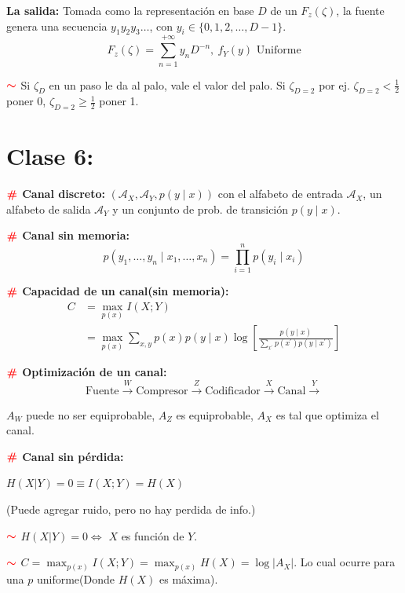 \documentclass[%
 reprint,
 amsmath,amssymb,
 aps,
]{revtex4-1}
\begin{document}
\textbf{La salida:} 
Tomada como la representación en base $D$ de un $F_z(\zeta )$, la fuente genera una secuencia $y_{1} y_{2} y_{3} \ldots$, con $y_{i} \in\{0,1,2, \ldots, D-1\}$.
$$
F_z(\zeta )=\sum_{n=1}^{+\infty} y_{n} D^{-n}, 
\ f_Y (y) \text{ Uniforme}
$$ 

\textbf{$\textcolor{red}{\color{red}{\boldsymbol{\sim}}}$} Si $\zeta_D$ en un paso le da al palo, vale el valor del palo.
Si $\zeta_{D=2}$ por ej. $\zeta_{D=2}< \frac{1}{2}$ poner 0, $\zeta_{D=2} \geq \frac{1}{2}$ poner 1.


\section{Clase 6:}

\textbf{$\color{red}{\textbf{\#}}$ Canal discreto:} 
$\left(\mathcal{A}_{X}, \mathcal{A}_{Y}, p(y \mid x)\right)$ con el alfabeto de entrada $\mathcal{A}_{X}$, un alfabeto de salida $\mathcal{A}_{Y}$ y un conjunto de prob. de transición $p(y \mid x)$.

\textbf{$\color{red}{\textbf{\#}}$ Canal sin memoria:} 
$$
p\left(y_{1}, \ldots, y_{n} \mid x_{1}, \ldots, x_{n}\right)=\prod_{i=1}^{n} p\left(y_{i} \mid x_{i}\right)
$$

\textbf{$\color{red}{\textbf{\#}}$ Capacidad de un canal(sin memoria):}
$$
\begin{aligned}
C &=\operatorname{max}_{p(x)} I(X ; Y) \\
&=\operatorname{max}_{p(x)} \sum_{x, y} p(x) p(y \mid x) \log \left[\frac{p(y \mid x)}{\sum_{x^{\prime}} p\left(x^{\prime}\right) p\left(y \mid x^{\prime}\right)}\right]
\end{aligned}
$$

\textbf{$\color{red}{\textbf{\#}}$ Optimización de un canal:}
$$\boxed{\text{Fuente}} \stackrel{W}{\rightarrow}
\boxed{\text{Compresor}} \stackrel{Z}{\rightarrow}
\boxed{\text{Codificador}} \stackrel{X}{\rightarrow}
\boxed{\text{Canal}} \stackrel{Y}{\rightarrow}$$

$A_W$ puede no ser equiprobable, $A_Z$ es equiprobable, $A_X$ es tal que optimiza el canal.

\textbf{$\color{red}{\textbf{\#}}$ Canal sin pérdida:} 

$H(X|Y)=0 \equiv I(X;Y)=H(X)$ 

(Puede agregar ruido, pero no hay perdida de info.)

\textbf{$\textcolor{red}{\color{red}{\boldsymbol{\sim}}}$} 
$H(X|Y)=0 \Leftrightarrow$ $X$ es función de $Y$.
 
\textbf{$\textcolor{red}{\color{red}{\boldsymbol{\sim}}}$} 
$C =\operatorname{max}_{p(x)} I(X ; Y)= \operatorname{max}_{p(x)}H(X)=\log|A_X|$. Lo cual ocurre para una $p$ uniforme(Donde $H(X)$ es máxima).
\end{document}

